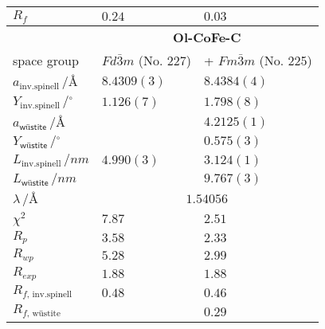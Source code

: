 \documentclass[\main/dresen_thesis.tex]{subfiles}
\begin{document}
\begin{table}[ht]
\begin{tabular}{ l | l | l }
      \rule{0pt}{2ex} $R_{f}$   & $0.24$ & $0.03$ \\
      \hline
      \hline
      \rule{0pt}{2ex} & \multicolumn{2}{c}{\textbf{Ol-CoFe-C}}\\
      \hline
      \hline
      \rule{0pt}{2ex}space group & $Fd\bar{3}m$ (No. 227) & + $Fm\bar{3}m$ (No. 225)\\
      \hline
      \rule{0pt}{2ex} $a_\mathrm{inv. spinell} \,/ \unit{\angstrom}$         & $8.4309(3)$ & $8.4384(4)$  \\
      \rule{0pt}{2ex} $Y_\mathrm{inv. spinell} \,/ \unit{^\circ}$            & $1.126(7)$  & $1.798(8)$   \\
      \rule{0pt}{2ex} $a_\textsf{w\"ustite}     \,/ \unit{\angstrom}$          &             & $4.2125(1)$  \\
      \rule{0pt}{2ex} $Y_\textsf{w\"ustite}     \,/ \unit{^\circ}$             &             & $0.575(3)$   \\
      \hline
      \rule{0pt}{2ex} $L_\mathrm{inv. spinell} \,/ \unit{nm}$                & $4.990(3)$  & $3.124(1)$ \\
      \rule{0pt}{2ex} $L_\textsf{w\"ustite}      \,/ \unit{nm}$                &             & $9.767(3)$ \\
      \hline
      \rule{0pt}{2ex} $\lambda \,/ \unit{\angstrom}$  & \multicolumn{2}{c}{$1.54056$}\\
      \hline
      \rule{0pt}{2ex} $\chi^2$                   & $7.87$ & $2.51$ \\
      \rule{0pt}{2ex} $R_p$                      & $3.58$ & $2.33$ \\
      \rule{0pt}{2ex} $R_{wp}$                   & $5.28$ & $2.99$ \\
      \rule{0pt}{2ex} $R_{exp}$                  & $1.88$ & $1.88$ \\
      \rule{0pt}{2ex} $R_{f, \, \mathrm{inv. spinell}}$   & $0.48$ & $0.46$ \\
      \rule{0pt}{2ex} $R_{f, \, \text{w\"ustite}}$       &        & $0.29$ \\
      \hline
    \end{tabular}
  \end{table}
\end{document}
